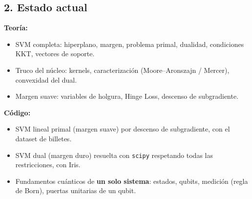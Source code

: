 \documentclass[12pt, a4paper]{article}
\begin{document}
\subsection*{2. Estado actual}

\begin{tcolorbox}[colback=green!5!white,colframe=green!50!black,title=\textbf{Hecho}]
\textbf{Teoría:}
\begin{itemize}
    \item SVM completa: hiperplano, margen, problema primal, dualidad, condiciones KKT, vectores de soporte.
    \item Truco del núcleo: kernels, caracterización (Moore--Aronszajn / Mercer), convexidad del dual.
    \item Margen suave: variables de holgura, Hinge Loss, descenso de subgradiente.
\end{itemize}
\textbf{Código:}
\begin{itemize}
    \item SVM lineal primal (margen suave) por descenso de subgradiente, con el dataset de billetes.
    \item SVM dual (margen duro) resuelta con \texttt{scipy} respetando todas las restricciones, con Iris.
\end{itemize}
\end{tcolorbox}

\begin{tcolorbox}[colback=yellow!5!white,colframe=orange!75!black,title=\textbf{Empezado}]
\begin{itemize}
    \item Fundamentos cuánticos de \textbf{un solo sistema}: estados, qubits, medición (regla de Born), puertas unitarias de un qubit.
\end{itemize}
\end{tcolorbox}
\end{document}
